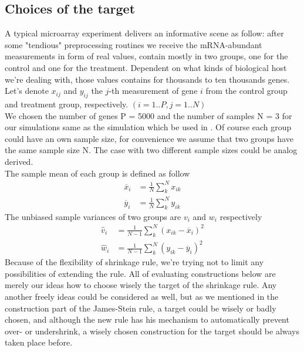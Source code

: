 \subsection{Choices of the target}
A typical microarray experiment delivers an informative scene as follow: after some "tendious" preprocessing routines we receive the mRNA-abundant measurements in form of real values, contain mostly in two groups, one for the control and one for the treatment. Dependent on what kinds of biological host we're dealing with, those values contains for thousands to ten thousands genes.\\
Let's denote $x_{ij}$ and $y_{ij}$ the $j$-th measurement of gene $i$ from the control group and treatment group, respectively. $(i = 1..P, j = 1..N)$\\
We chosen the number of genes P = 5000 and the number of samples N = 3 for our simulations same as the simulation which be used in \cite{OpgenRhein:2007p11}. Of course each group could have an own sample size, for convenience we assume that two groups have the same sample size N. The case with two different sample sizes could be analog derived.\\
The sample mean of each group is defined as follow
\begin{align*}
	\overline{x}_i &= \frac{1}{N}\sum^N_k x_{ik} \\
	\overline{y}_i &= \frac{1}{N}\sum^N_k y_{ik}
\end{align*}
The unbiased sample variances of two groups are $v_i$ and $w_i$ respectively
\begin{align*}
	\hat v_i &= \frac{1}{N-1}\sum^N_k (x_{ik} - \overline{x}_i)^2 \\
	\hat w_i &= \frac{1}{N-1}\sum^N_k (y_{ik} - \overline{y}_i)^2
\end{align*}
Because of the flexibility of shrinkage rule, we're trying not to limit any possibilities of extending the rule. All of evaluating constructions below are merely our ideas how to choose wisely the target of the shrinkage rule. Any another freely ideas could be considered as well, but as we mentioned in the construction part of the James-Stein rule, a target could be wisely or badly chosen, and although the new rule has his mechanism to automatically prevent over- or undershrink, a wisely chosen construction for the target should be always taken place before.
